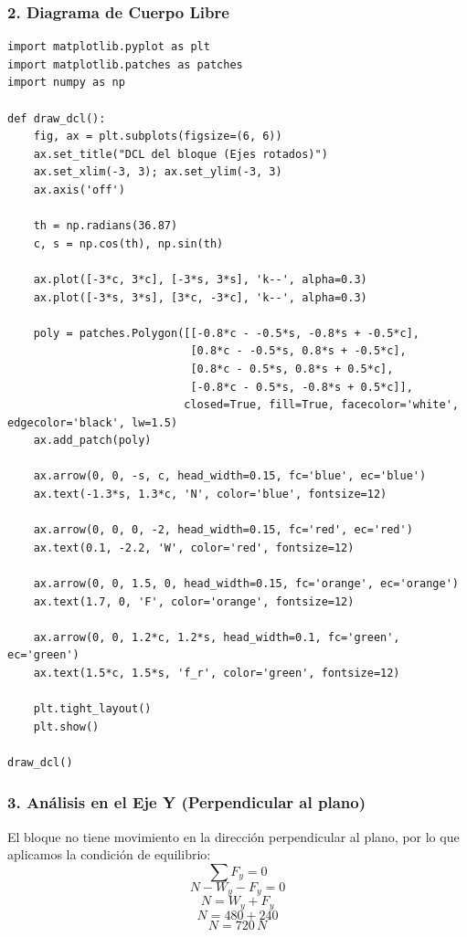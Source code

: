 \documentclass[12pt, a4paper]{article}
\begin{document}
\subsubsection*{2. Diagrama de Cuerpo Libre}
\begin{lstlisting}
import matplotlib.pyplot as plt
import matplotlib.patches as patches
import numpy as np

def draw_dcl():
    fig, ax = plt.subplots(figsize=(6, 6))
    ax.set_title("DCL del bloque (Ejes rotados)")
    ax.set_xlim(-3, 3); ax.set_ylim(-3, 3)
    ax.axis('off')
    
    th = np.radians(36.87)
    c, s = np.cos(th), np.sin(th)
    
    ax.plot([-3*c, 3*c], [-3*s, 3*s], 'k--', alpha=0.3)
    ax.plot([-3*s, 3*s], [3*c, -3*c], 'k--', alpha=0.3)
    
    poly = patches.Polygon([[-0.8*c - -0.5*s, -0.8*s + -0.5*c], 
                            [0.8*c - -0.5*s, 0.8*s + -0.5*c], 
                            [0.8*c - 0.5*s, 0.8*s + 0.5*c], 
                            [-0.8*c - 0.5*s, -0.8*s + 0.5*c]], 
                           closed=True, fill=True, facecolor='white', edgecolor='black', lw=1.5)
    ax.add_patch(poly)
    
    ax.arrow(0, 0, -s, c, head_width=0.15, fc='blue', ec='blue')
    ax.text(-1.3*s, 1.3*c, 'N', color='blue', fontsize=12)
    
    ax.arrow(0, 0, 0, -2, head_width=0.15, fc='red', ec='red')
    ax.text(0.1, -2.2, 'W', color='red', fontsize=12)
    
    ax.arrow(0, 0, 1.5, 0, head_width=0.15, fc='orange', ec='orange')
    ax.text(1.7, 0, 'F', color='orange', fontsize=12)
    
    ax.arrow(0, 0, 1.2*c, 1.2*s, head_width=0.1, fc='green', ec='green')
    ax.text(1.5*c, 1.5*s, 'f_r', color='green', fontsize=12)

    plt.tight_layout()
    plt.show()

draw_dcl()
\end{lstlisting}

\subsubsection*{3. Análisis en el Eje Y (Perpendicular al plano)}
El bloque no tiene movimiento en la dirección perpendicular al plano, por lo que aplicamos la condición de equilibrio:
$$ \sum F_y = 0 $$
$$ N - W_y - F_y = 0 $$
$$ N = W_y + F_y $$
$$ N = 480 + 240 $$
$$ N = 720 \, \si{N} $$
\end{document}
